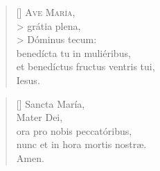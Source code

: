 \documentclass[omni.tex]{subfiles}
\begin{document}
\settowidth{\versewidth}{Et ne nos ind\'ucas in tentati\'onem}

\begin{verse}[\versewidth]
\lettrine[lhang=1.0,nindent=0em]{A}{ve Mar\'ia}, \\>
gr\'atia plena,\\>
D\'ominus tecum: \\
bened\'icta tu in muli\'eribus, \\
et bened\'ictus fructus ventris tui, \\
Iesus.
\end{verse}

\begin{verse}[\versewidth]
Sancta Mar\'ia, \\
Mater Dei, \\
ora pro nobis peccat\'oribus, \\
nunc et in hora mortis nostr\ae. \\
Amen. \\[4\baselineskip]
\end{verse}

\pagebreak
\end{document}
